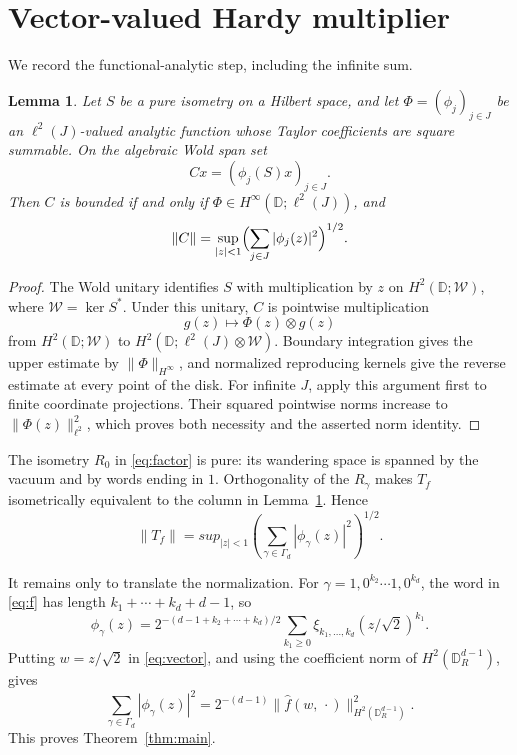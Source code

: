 \documentclass[11pt]{article}
\newtheorem{lemma}{Lemma}
\newcommand{\D}{\mathbb D}
\begin{document}
\section{Vector-valued Hardy multiplier}

We record the functional-analytic step, including the infinite sum.

\begin{lemma}\label{lem:column}
Let $S$ be a pure isometry on a Hilbert space, and let
$\Phi=(\phi_j)_{j\in J}$ be an $\ell^2(J)$-valued analytic function whose
Taylor coefficients are square summable.  On the algebraic Wold span set
\[
 Cx=(\phi_j(S)x)_{j\in J}.
\]
Then $C$ is bounded if and only if
$\Phi\in H^\infty(\D;\ell^2(J))$, and
\[
 \|C\|=\sup_{|z|<1}\Bigl(\sum_{j\in J}|\phi_j(z)|^2\Bigr)^{1/2}.
\]
\end{lemma}

\begin{proof}
The Wold unitary identifies $S$ with multiplication by $z$ on
$H^2(\D;\mathcal W)$, where $\mathcal W=\ker S^*$.  Under this unitary,
$C$ is pointwise multiplication
\[
 g(z)\longmapsto \Phi(z)\otimes g(z)
\]
from $H^2(\D;\mathcal W)$ to
$H^2(\D;\ell^2(J)\otimes\mathcal W)$.  Boundary integration gives the
upper estimate by $\|\Phi\|_{H^\infty}$, and normalized reproducing kernels
give the reverse estimate at every point of the disk.  For infinite $J$,
apply this argument first to finite coordinate projections.  Their squared
pointwise norms increase to $\|\Phi(z)\|_{\ell^2}^2$, which proves both
necessity and the asserted norm identity.
\end{proof}

The isometry $R_0$ in \eqref{eq:factor} is pure: its wandering space is
spanned by the vacuum and by words ending in $1$.  Orthogonality of the
$R_\gamma$ makes $T_f$ isometrically equivalent to the column in
Lemma~\ref{lem:column}.  Hence
\begin{equation}\label{eq:vector}
 \|T_f\|=sup_{|z|<1}
 \left(\sum_{\gamma\in\Gamma_d}|\phi_\gamma(z)|^2\right)^{1/2}.
\end{equation}

It remains only to translate the normalization.  For
$\gamma=1,0^{k_2}\cdots1,0^{k_d}$, the word in \eqref{eq:f} has length
$k_1+\cdots+k_d+d-1$, so
\[
 \phi_\gamma(z)
 =2^{-(d-1+k_2+\cdots+k_d)/2}
 \sum_{k_1\ge0}\xi_{k_1,\ldots,k_d}(z/\sqrt2)^{k_1}.
\]
Putting $w=z/\sqrt2$ in \eqref{eq:vector}, and using the coefficient norm
of $H^2(\D_R^{d-1})$, gives
\[
 \sum_{\gamma\in\Gamma_d}|\phi_\gamma(z)|^2
 =2^{-(d-1)}
 \|\widehat f(w,\,\cdot)\|_{H^2(\D_R^{d-1})}^2.
\]
This proves Theorem~\ref{thm:main}.
\end{document}
